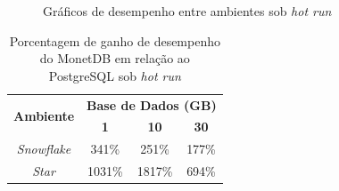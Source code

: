 \begin{figure}[htpb]
        \centering
        \caption{Gráficos de desempenho entre ambientes sob \textit{hot run}}
        \label{fig:qph_model_hot}
\end{figure}

\begin{table}[htpb]
        \centering
        \caption{Porcentagem de ganho de desempenho do MonetDB em relação ao PostgreSQL sob \textit{hot run}}
        \label{tab:ganho_monet_psql_hot}
        \begin{tabular}{|c|c|c|c|}
        \hline
        \multirow{2}{*}{\textbf{Ambiente}} & \multicolumn{3}{c|}{\textbf{Base de Dados (GB)}} \\ \cline{2-4} 
        & \textbf{1}     & \textbf{10}    & \textbf{30}    \\ \hline
        \textit{Snowflake}                 & 341\%          & 251\%          & 177\%          \\ \hline
        \textit{Star}                      & 1031\%         & 1817\%         & 694\%          \\ \hline
        \end{tabular}
\end{table}
    
